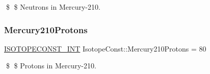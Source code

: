 \$ \$ Neutrons in Mercury-\/210. \mbox{\label{group___isotope_const-_mercury-_hg210_ga5e8e00433d814fffad07dad4ddab5068}} 
\subsubsection{\texorpdfstring{Mercury210\+Protons}{Mercury210Protons}}
{\footnotesize\ttfamily \mbox{\hyperlink{group___isotope_const-_macros_ga5f18360b3e99483a35c32d789e62621c}{I\+S\+O\+T\+O\+P\+E\+C\+O\+N\+S\+T\+\_\+\+I\+NT}} Isotope\+Const\+::\+Mercury210\+Protons = 80}

\$ \$ Protons in Mercury-\/210. 